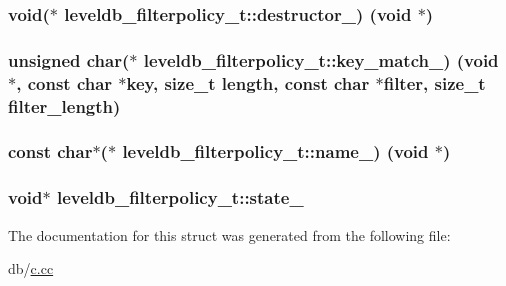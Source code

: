 \subsubsection[{destructor\+\_\+}]{\setlength{\rightskip}{0pt plus 5cm}void($\ast$ leveldb\+\_\+filterpolicy\+\_\+t\+::destructor\+\_\+) (void $\ast$)}\label{structleveldb__filterpolicy__t_ac743c53a14a4061cf30832a1861573ed}
\hypertarget{structleveldb__filterpolicy__t_a453f04cb3420879256c6194b5de0a818}{}
\subsubsection[{key\+\_\+match\+\_\+}]{\setlength{\rightskip}{0pt plus 5cm}unsigned char($\ast$ leveldb\+\_\+filterpolicy\+\_\+t\+::key\+\_\+match\+\_\+) (void $\ast$, const char $\ast$key, size\+\_\+t length, const char $\ast$filter, size\+\_\+t filter\+\_\+length)}\label{structleveldb__filterpolicy__t_a453f04cb3420879256c6194b5de0a818}
\hypertarget{structleveldb__filterpolicy__t_a5fbc18ad0916314ffafe205543bad720}{}
\subsubsection[{name\+\_\+}]{\setlength{\rightskip}{0pt plus 5cm}const char$\ast$($\ast$ leveldb\+\_\+filterpolicy\+\_\+t\+::name\+\_\+) (void $\ast$)}\label{structleveldb__filterpolicy__t_a5fbc18ad0916314ffafe205543bad720}
\hypertarget{structleveldb__filterpolicy__t_a35aa5dd2f350f6eafa4ae904e55dcbe2}{}
\subsubsection[{state\+\_\+}]{\setlength{\rightskip}{0pt plus 5cm}void$\ast$ leveldb\+\_\+filterpolicy\+\_\+t\+::state\+\_\+}\label{structleveldb__filterpolicy__t_a35aa5dd2f350f6eafa4ae904e55dcbe2}


The documentation for this struct was generated from the following file\+:\begin{DoxyCompactItemize}
\item 
db/\hyperlink{c_8cc}{c.\+cc}\end{DoxyCompactItemize}
